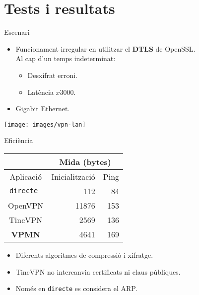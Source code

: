 \section{Tests i resultats}
    \begin{frame}{Escenari}
        \begin{itemize}
\item Funcionament irregular en utilitzar el \textbf{DTLS} de OpenSSL.\\
Al cap d'un temps indeterminat:
	        \begin{itemize}
\item Desxifrat erroni.
\item Latència $x3000$.
	        \end{itemize}
        \end{itemize}
        \begin{itemize}
\item Gigabit Ethernet.
        \end{itemize}
        \vspace{2em}
        \begin{center}
        \texttt{[image: images/vpn-lan]}
        \end{center}
    \end{frame}
    \begin{frame}{Eficiència}
        \begin{center}
\begin{tabular}{|c|r|r|}
\multicolumn{1}{c}{} & \multicolumn{2}{|c|}{Mida (bytes)} \\ \hline
Aplicació & Inicialització & Ping \\ \hline \hline
\tt directe & 112 & 84 \\ \hline
OpenVPN & 11876 & 153 \\ \hline
TincVPN & 2569 & 136 \\ \hline
\bf VPMN & 4641 & 169 \\ \hline
\end{tabular}
        \end{center}
        \begin{itemize}
\item Diferents algoritmes de compressió i xifratge.
\item TincVPN no intercanvia certificats ni claus públiques.
\item Només en {\tt directe} es considera el ARP.
        \end{itemize}
    \end{frame}
